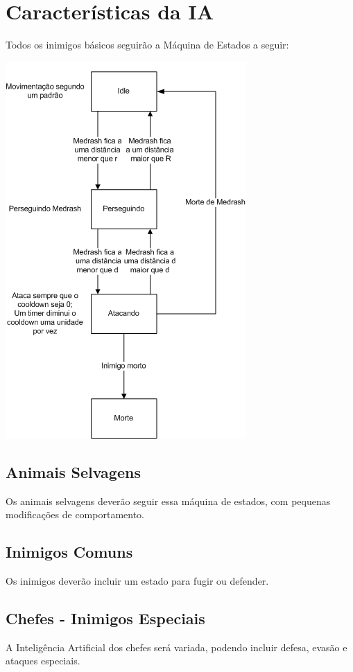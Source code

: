\documentclass[letterpaper,11pt]{article}
\begin{document}
\section{Características da IA}
 Todos os inimigos básicos seguirão a Máquina de Estados a seguir:
 \begin{center}
  \includegraphics[scale=1.0]{ia_simples.png}
 \end{center}

\subsection{Animais Selvagens}
 Os animais selvagens deverão seguir essa máquina de estados, com pequenas modificações de comportamento.

\subsection{Inimigos Comuns}
 Os inimigos deverão incluir um estado para fugir ou defender.

\subsection{Chefes - Inimigos Especiais}
 A Inteligência Artificial dos chefes será variada, podendo incluir defesa, evasão e ataques especiais.
\end{document}
